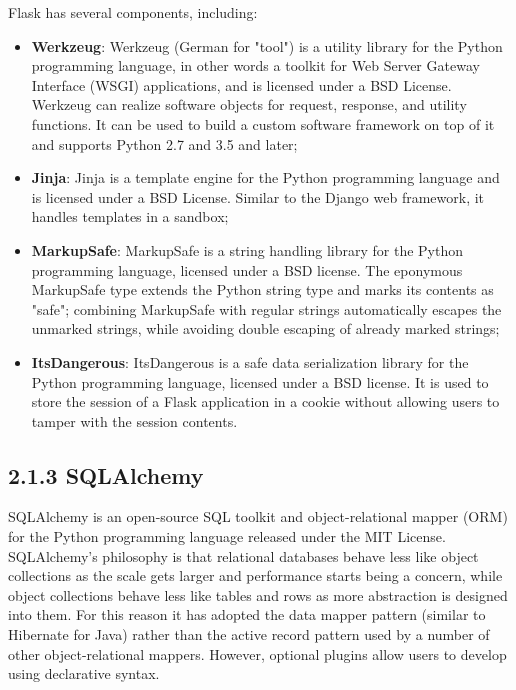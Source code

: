 Flask has several components, including:
\begin{itemize}
    \item \textbf{Werkzeug}: Werkzeug (German for "tool") is a utility library for the Python programming language, in other words a toolkit for Web Server Gateway Interface (WSGI) applications, and is licensed under a BSD License. Werkzeug can realize software objects for request, response, and utility functions. It can be used to build a custom software framework on top of it and supports Python 2.7 and 3.5 and later;
    
    \item \textbf{Jinja}: Jinja is a template engine for the Python programming language and is licensed under a BSD License. Similar to the Django web framework, it handles templates in a sandbox;
    
    \item \textbf{MarkupSafe}: MarkupSafe is a string handling library for the Python programming language, licensed under a BSD license. The eponymous MarkupSafe type extends the Python string type and marks its contents as "safe"; combining MarkupSafe with regular strings automatically escapes the unmarked strings, while avoiding double escaping of already marked strings;
    
    \item \textbf{ItsDangerous}: ItsDangerous is a safe data serialization library for the Python programming language, licensed under a BSD license. It is used to store the session of a Flask application in a cookie without allowing users to tamper with the session contents.

\end{itemize}


\subsection*{2.1.3 \hspace{1cm} SQLAlchemy}
SQLAlchemy is an open-source SQL toolkit and object-relational mapper (ORM) for the Python programming language released under the MIT License. \\

SQLAlchemy's philosophy is that relational databases behave less like object collections as the scale gets larger and performance starts being a concern, while object collections behave less like tables and rows as more abstraction is designed into them. For this reason it has adopted the data mapper pattern (similar to Hibernate for Java) rather than the active record pattern used by a number of other object-relational mappers. However, optional plugins allow users to develop using declarative syntax. \\

